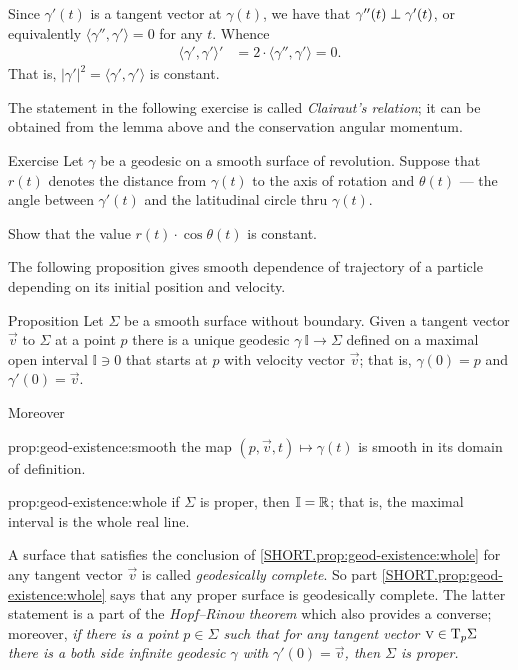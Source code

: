 Since $\gamma'(t)$ is a tangent vector at $\gamma(t)$,
we have that $\gamma''(t)\z\perp\gamma'(t)$, or equivalently $\langle\gamma'',\gamma'\rangle=0$ for any $t$.
Whence 
\begin{align*}
\langle\gamma',\gamma'\rangle'&=2\cdot \langle\gamma'',\gamma'\rangle=0.
\end{align*}
That is, $|\gamma'|^2=\langle\gamma',\gamma'\rangle$ is constant.
\qeds

The statement in the following exercise is called \emph{Clairaut's relation};
it can be obtained from the lemma above and the conservation angular momentum.

\begin{thm}{Exercise}\label{ex:clairaut}
Let $\gamma$ be a geodesic on a smooth surface of revolution.
Suppose that $r(t)$ denotes the distance from $\gamma(t)$ to the axis of rotation
and $\theta(t)$ --- the angle between $\gamma'(t)$ and the latitudinal circle thru $\gamma(t)$. 

Show that the value $r(t)\cdot \cos\theta(t)$ is constant. 
\end{thm}


The following proposition gives smooth dependence of trajectory of a particle depending on its initial position and velocity.


\begin{thm}{Proposition}\label{prop:geod-existence} 
Let $\Sigma$ be  a smooth surface without boundary.
Given a tangent vector ${\vec v}$ to $\Sigma$ at a point $p$
there is a unique geodesic $\gamma\:\mathbb{I}\to \Sigma$ defined on a maximal open interval $\mathbb{I}\ni 0$ that starts at $p$ with velocity vector ${\vec v}$;
that is, $\gamma(0)=p$ and $\gamma'(0)={\vec v}$.

Moreover
\begin{subthm}{prop:geod-existence:smooth} the map $(p,{\vec v},t)\mapsto \gamma(t)$ is smooth in its domain of definition.
\end{subthm}

\begin{subthm}{prop:geod-existence:whole} if $\Sigma$ is proper, then $\mathbb{I}=\mathbb{R}$; that is, the maximal interval is the whole real line.
\end{subthm}

\end{thm}

A surface that satisfies the conclusion of \ref{SHORT.prop:geod-existence:whole} for any tangent vector ${\vec v}$ is called \emph{geodesically complete}.
So part \ref{SHORT.prop:geod-existence:whole} says that any proper surface is geodesically complete.
The latter statement is a part of the \emph{Hopf--Rinow theorem} \cite{hopf-rinow} which also provides a converse;
moreover, 
\emph{if there is a point $p\in \Sigma$ such that for any tangent vector ${\text{\sc{v}}}\in\mathrm{T}_p\Sigma$ there is a both side infinite geodesic $\gamma$ with $\gamma'(0)={\vec v}$, then $\Sigma$ is proper.}

